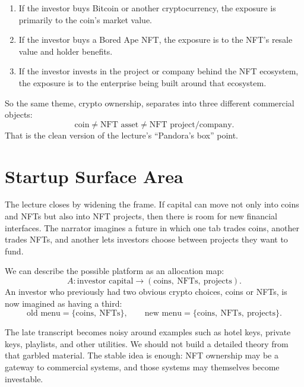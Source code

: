 \begin{enumerate}
\item If the investor buys Bitcoin or another cryptocurrency, the exposure is primarily to the coin's market value.
\item If the investor buys a Bored Ape NFT, the exposure is to the NFT's resale value and holder benefits.
\item If the investor invests in the project or company behind the NFT ecosystem, the exposure is to the enterprise being built around that ecosystem.
\end{enumerate}

So the same theme, crypto ownership, separates into three different commercial objects:
\begin{equation}
\text{coin} \neq \text{NFT asset} \neq \text{NFT project/company}.
\end{equation}
That is the clean version of the lecture's ``Pandora's box'' point.

\section{Startup Surface Area}

The lecture closes by widening the frame. If capital can move not only into coins and NFTs but also into NFT projects, then there is room for new financial interfaces. The narrator imagines a future in which one tab trades coins, another trades NFTs, and another lets investors choose between projects they want to fund.

We can describe the possible platform as an allocation map:
\begin{equation}
A:
\text{investor capital}
\longrightarrow
(\text{coins},\ \text{NFTs},\ \text{projects}).
\end{equation}
An investor who previously had two obvious crypto choices, coins or NFTs, is now imagined as having a third:
\begin{equation}
\text{old menu} = \{\text{coins},\ \text{NFTs}\},
\qquad
\text{new menu} = \{\text{coins},\ \text{NFTs},\ \text{projects}\}.
\end{equation}

The late transcript becomes noisy around examples such as hotel keys, private keys, playlists, and other utilities. We should not build a detailed theory from that garbled material. The stable idea is enough: NFT ownership may be a gateway to commercial systems, and those systems may themselves become investable.

